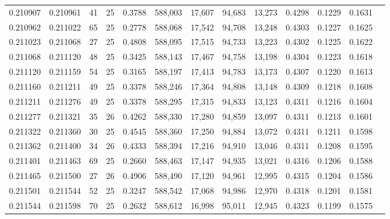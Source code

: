 \begin{tabular}{rrrrrrrrrrrrr}
0.210907 & 0.210961 &  41 &  25 &                                     0.3788 & 588,003 &  17,607 &  94,683 &  13,273 & 0.4298 & 0.1229 & 0.1631 \\
0.210962 & 0.211022 &  65 &  25 &                                     0.2778 & 588,068 &  17,542 &  94,708 &  13,248 & 0.4303 & 0.1227 & 0.1625 \\
0.211023 & 0.211068 &  27 &  25 &                                     0.4808 & 588,095 &  17,515 &  94,733 &  13,223 & 0.4302 & 0.1225 & 0.1622 \\
0.211068 & 0.211120 &  48 &  25 &                                     0.3425 & 588,143 &  17,467 &  94,758 &  13,198 & 0.4304 & 0.1223 & 0.1618 \\
0.211120 & 0.211159 &  54 &  25 &                                     0.3165 & 588,197 &  17,413 &  94,783 &  13,173 & 0.4307 & 0.1220 & 0.1613 \\
0.211160 & 0.211211 &  49 &  25 &                                     0.3378 & 588,246 &  17,364 &  94,808 &  13,148 & 0.4309 & 0.1218 & 0.1608 \\
0.211211 & 0.211276 &  49 &  25 &                                     0.3378 & 588,295 &  17,315 &  94,833 &  13,123 & 0.4311 & 0.1216 & 0.1604 \\
0.211277 & 0.211321 &  35 &  26 &                                     0.4262 & 588,330 &  17,280 &  94,859 &  13,097 & 0.4311 & 0.1213 & 0.1601 \\
0.211322 & 0.211360 &  30 &  25 &                                     0.4545 & 588,360 &  17,250 &  94,884 &  13,072 & 0.4311 & 0.1211 & 0.1598 \\
0.211362 & 0.211400 &  34 &  26 &                                     0.4333 & 588,394 &  17,216 &  94,910 &  13,046 & 0.4311 & 0.1208 & 0.1595 \\
0.211401 & 0.211463 &  69 &  25 &                                     0.2660 & 588,463 &  17,147 &  94,935 &  13,021 & 0.4316 & 0.1206 & 0.1588 \\
0.211465 & 0.211500 &  27 &  26 &                                     0.4906 & 588,490 &  17,120 &  94,961 &  12,995 & 0.4315 & 0.1204 & 0.1586 \\
0.211501 & 0.211544 &  52 &  25 &                                     0.3247 & 588,542 &  17,068 &  94,986 &  12,970 & 0.4318 & 0.1201 & 0.1581 \\
0.211544 & 0.211598 &  70 &  25 &                                     0.2632 & 588,612 &  16,998 &  95,011 &  12,945 & 0.4323 & 0.1199 & 0.1575 \\

\end{tabular}
